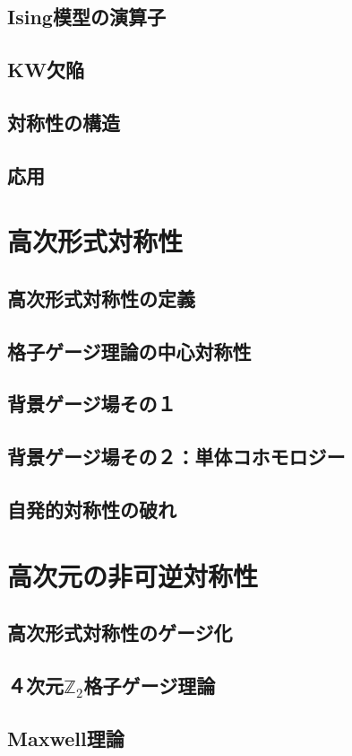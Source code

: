 \documentclass[report,paper=a4, fontsize=12pt, line_length=16cm, number_of_lines=33,dvipdfmx]{jlreq}
\numberwithin{equation}{chapter}
\newcommand{\Ztwo}{\mbox{$\mathbb{Z}_{2}$}}
\begin{document}
\section{Ising模型の演算子}
\section{KW欠陥}
\section{対称性の構造}
\section{応用}


\chapter{高次形式対称性}
\section{高次形式対称性の定義}
\section{格子ゲージ理論の中心対称性}
\section{背景ゲージ場その１}
\section{背景ゲージ場その２：単体コホモロジー}
\section{自発的対称性の破れ}


\chapter{高次元の非可逆対称性}
\section{高次形式対称性のゲージ化}
\section{４次元\texorpdfstring{\Ztwo}{Z2}格子ゲージ理論}
\section{Maxwell理論}



\end{document}
